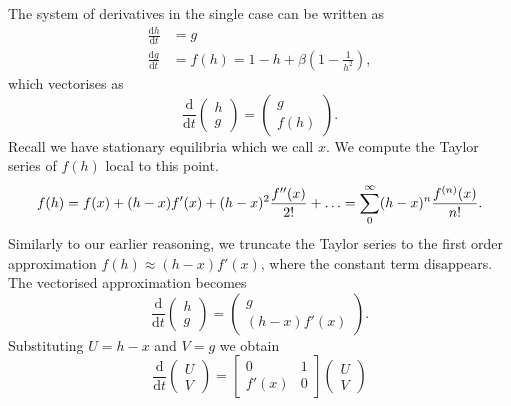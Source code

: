 The system of derivatives in the single case can be written as
\begin{equation}
    \begin{aligned}
        \frac{\mathrm{d}h}{\mathrm{d}t} &= g \\
        \frac{\mathrm{d}g}{\mathrm{d}t} &= f(h) = 1-h +\beta\left(1-\frac{1}{h^2}\right),
    \end{aligned}
\end{equation}
which vectorises as
\begin{equation}
    \frac{\mathrm{d}}{\mathrm{d}t} \begin{pmatrix}
        h \\
        g
    \end{pmatrix} = \begin{pmatrix}
        g \\
        f(h)
    \end{pmatrix}.
\end{equation}
Recall we have stationary equilibria which we call \(x\). We compute the Taylor series of \(f(h)\) local to this point.
\begin{equation}
    f(h) = f(x) + (h-x)f'(x) + (h-x)^2\frac{f''(x)}{2!} + \mathellipsis =\sum_{0}^{\infty} (h-x)^n\frac{f^{(n)}(x)}{n!}.
\end{equation}
Similarly to our earlier reasoning, we truncate the Taylor series to the first order approximation $f(h) \approx (h-x)f'(x)$,
where the constant term disappears.
The vectorised approximation becomes
\begin{equation}
    \frac{\mathrm{d}}{\mathrm{d}t}\begin{pmatrix}
        h \\
        g
    \end{pmatrix} = \begin{pmatrix}
        g \\
        (h-x)f'(x)
    \end{pmatrix}.
\end{equation}
Substituting \(U = h-x\) and \(V = g\) we obtain
\begin{equation}
    \frac{\mathrm{d}}{\mathrm{d}t} \begin{pmatrix}
        U \\
        V
    \end{pmatrix} = \begin{bmatrix}
        0 & 1 \\
        f'(x) & 0
    \end{bmatrix} \begin{pmatrix}
        U \\
        V
    \end{pmatrix} 
\end{equation}
